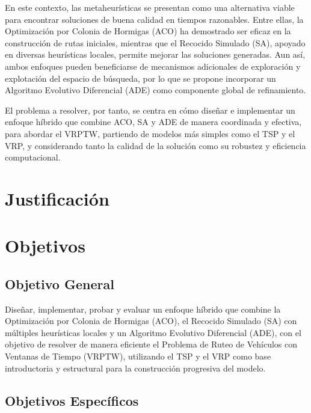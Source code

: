 \documentclass[12pt,titlepage,twoside,openright]{book}
\begin{document}
En este contexto, las metaheurísticas se presentan como una alternativa viable para encontrar soluciones de buena calidad en tiempos razonables. Entre ellas, la Optimización por Colonia de Hormigas (ACO) ha demostrado ser eficaz en la construcción de rutas iniciales, mientras que el Recocido Simulado (SA), apoyado en diversas heurísticas locales, permite mejorar las soluciones generadas. Aun así, ambos enfoques pueden beneficiarse de mecanismos adicionales de exploración y explotación del espacio de búsqueda, por lo que se propone incorporar un Algoritmo Evolutivo Diferencial (ADE) como componente global de refinamiento.

El problema a resolver, por tanto, se centra en cómo diseñar e implementar un enfoque híbrido que combine ACO, SA y ADE de manera coordinada y efectiva, para abordar el VRPTW, partiendo de modelos más simples como el TSP y el VRP, y considerando tanto la calidad de la solución como su robustez y eficiencia computacional.

\section{Justificación}

\section{Objetivos}
\subsection{Objetivo General}

Diseñar, implementar, probar y evaluar un enfoque híbrido que combine la Optimización por Colonia de Hormigas (ACO), el Recocido Simulado (SA) con múltiples heurísticas locales y un Algoritmo Evolutivo Diferencial (ADE), con el objetivo de resolver de manera eficiente el Problema de Ruteo de Vehículos con Ventanas de Tiempo (VRPTW), utilizando el TSP y el VRP como base introductoria y estructural para la construcción progresiva del modelo.
\subsection{Objetivos Específicos}
\end{document}
